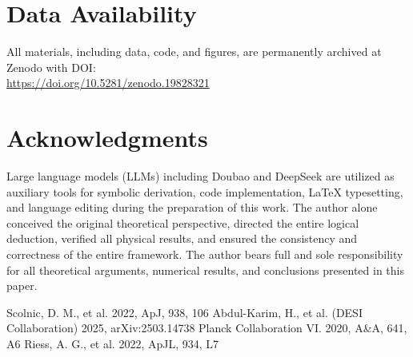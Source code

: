 \documentclass[10pt,twocolumn]{article}
\begin{document}
\section{Data Availability}
All materials, including data, code, and figures, are permanently archived
at Zenodo with DOI:\\
\url{https://doi.org/10.5281/zenodo.19828321}

\section*{Acknowledgments}
Large language models (LLMs) including Doubao and DeepSeek are utilized as auxiliary tools for symbolic derivation, code implementation, LaTeX typesetting, and language editing during the preparation of this work. The author alone conceived the original theoretical perspective, directed the entire logical deduction, verified all physical results, and ensured the consistency and correctness of the entire framework. The author bears full and sole responsibility for all theoretical arguments, numerical results, and conclusions presented in this paper.

\begin{thebibliography}{}
Scolnic, D. M., et al. 2022, ApJ, 938, 106
Abdul-Karim, H., et al. (DESI Collaboration) 2025, arXiv:2503.14738
Planck Collaboration VI. 2020, A\&A, 641, A6
Riess, A. G., et al. 2022, ApJL, 934, L7
\end{thebibliography}
\end{document}
